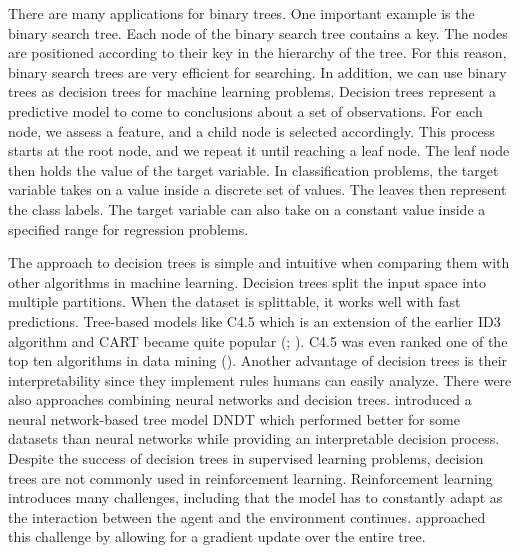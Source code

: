 There are many applications for binary trees. One important example is the binary search tree. Each node of the binary search tree contains a key. The nodes are positioned according to their key in the hierarchy of the tree. For this reason, binary search trees are very efficient for searching. In addition, we can use binary trees as decision trees for machine learning problems. Decision trees represent a predictive model to come to conclusions about a set of observations. For each node, we assess a feature, and a child node is selected accordingly. This process starts at the root node, and we repeat it until reaching a leaf node. The leaf node then holds the value of the target variable. In classification problems, the target variable takes on a value inside a discrete set of values. The leaves then represent the class labels. The target variable can also take on a constant value inside a specified range for regression problems.

The approach to decision trees is simple and intuitive when comparing them with other algorithms in machine learning. Decision trees split the input space into multiple partitions. When the dataset is splittable, it works well with fast predictions. Tree-based models like C4.5 which is an extension of the earlier ID3 algorithm and CART became quite popular (\cite{quinlan2014c4}; \cite{breiman2017classification}). C4.5 was even ranked one of the top ten algorithms in data mining (\cite{wu2008top}). Another advantage of decision trees is their interpretability since they implement rules humans can easily analyze. There were also approaches combining neural networks and decision trees. \cite{yang2018deep} introduced a neural network-based tree model DNDT which performed better for some datasets than neural networks while providing an interpretable decision process. Despite the success of decision trees in supervised learning problems, decision trees are not commonly used in reinforcement learning. Reinforcement learning introduces many challenges, including that the model has to constantly adapt as the interaction between the agent and the environment continues. \cite{silva2020optimization} approached this challenge by allowing for a gradient update over the entire tree.

